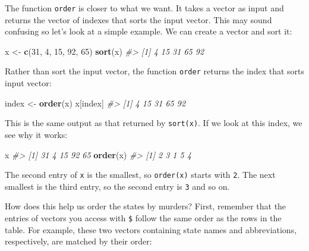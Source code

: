 \documentclass[
]{krantz}
\newenvironment{Shaded}{\begin{snugshade}}{\end{snugshade}}
\newcommand{\CommentTok}[1]{\textcolor[rgb]{0.37,0.37,0.37}{\textit{#1}}}
\newcommand{\DecValTok}[1]{\textcolor[rgb]{0.06,0.06,0.06}{#1}}
\newcommand{\KeywordTok}[1]{\textcolor[rgb]{0.27,0.27,0.27}{\textbf{#1}}}
\newcommand{\NormalTok}[1]{#1}
\newcommand{\OperatorTok}[1]{\textcolor[rgb]{0.43,0.43,0.43}{\textbf{#1}}}
\newcommand{\StringTok}[1]{\textcolor[rgb]{0.5,0.5,0.5}{#1}}
\begin{document}
The function \texttt{order} is closer to what we want. It takes a vector as input and returns the vector of indexes that sorts the input vector. This may sound confusing so let's look at a simple example. We can create a vector and sort it:

\begin{Shaded}
\begin{Highlighting}[]
\NormalTok{x <-}\StringTok{ }\KeywordTok{c}\NormalTok{(}\DecValTok{31}\NormalTok{, }\DecValTok{4}\NormalTok{, }\DecValTok{15}\NormalTok{, }\DecValTok{92}\NormalTok{, }\DecValTok{65}\NormalTok{)}
\KeywordTok{sort}\NormalTok{(x)}
\CommentTok{#> [1]  4 15 31 65 92}
\end{Highlighting}
\end{Shaded}

Rather than sort the input vector, the function \texttt{order} returns the index that sorts input vector:

\begin{Shaded}
\begin{Highlighting}[]
\NormalTok{index <-}\StringTok{ }\KeywordTok{order}\NormalTok{(x)}
\NormalTok{x[index]}
\CommentTok{#> [1]  4 15 31 65 92}
\end{Highlighting}
\end{Shaded}

This is the same output as that returned by \texttt{sort(x)}. If we look at this index, we see why it works:

\begin{Shaded}
\begin{Highlighting}[]
\NormalTok{x}
\CommentTok{#> [1] 31  4 15 92 65}
\KeywordTok{order}\NormalTok{(x)}
\CommentTok{#> [1] 2 3 1 5 4}
\end{Highlighting}
\end{Shaded}

The second entry of \texttt{x} is the smallest, so \texttt{order(x)} starts with \texttt{2}. The next smallest is the third entry, so the second entry is \texttt{3} and so on.

How does this help us order the states by murders? First, remember that the entries of vectors you access with \texttt{\$} follow the same order as the rows in the table. For example, these two vectors containing state names and abbreviations, respectively, are matched by their order:

\begin{Shaded}
\end{Shaded}
\end{document}
